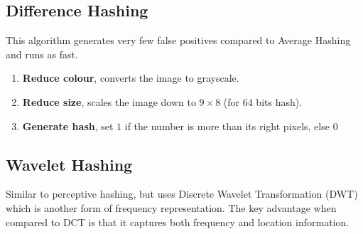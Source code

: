 \subsection{Difference Hashing}
This algorithm generates very few false positives compared to Average Hashing and runs as fast.
\begin{enumerate}
    \item \textbf{Reduce colour}, converts the image to grayscale.
    \item \textbf{Reduce size}, scales the image down to $9\times8$ (for 64 bits hash).
    \item \textbf{Generate hash}, set $1$ if the number is more than its right pixels, else $0$
\end{enumerate}

\subsection{Wavelet Hashing}
Similar to perceptive hashing, but uses Discrete Wavelet Transformation (DWT) which is another form of frequency representation. The key advantage when compared to DCT is that it captures both frequency and location information\cite{DiscreteWaveletTransform2022}. 







